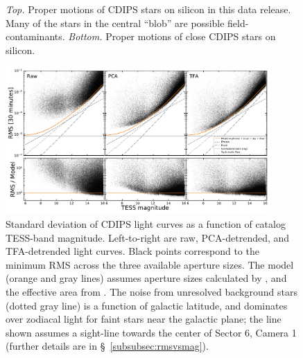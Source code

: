 \documentclass[12pt,twocolumn,tighten,trackchanges]{aastex62}
\begin{document}
\begin{figure}[!t]
	\vspace{-0.9cm}
	\vspace{-0.9cm}
	\caption{
		{\it Top.} Proper motions of CDIPS stars on silicon in this
		data release.  Many of the stars in the central ``blob'' are possible
		field-contaminants.
		{\it Bottom.} Proper motions of close CDIPS stars
		on silicon.
	}
	\label{fig:propermotions}
\end{figure}

\begin{figure}[!t]
	\begin{center}
		\leavevmode
		\includegraphics[width=0.9\textwidth]{IRM-PCA-TFA_rms_vs_mag.pdf}
	\end{center}
	\vspace{-0.7cm}
	\caption{
    Standard deviation of CDIPS light curves as a function of catalog
    TESS-band magnitude.  Left-to-right are raw, PCA-detrended, and
    TFA-detrended light curves. Black points correspond to the minimum
    RMS across the three available aperture sizes.  The model (orange
    and gray lines) assumes aperture sizes calculated by
    \citet{Sullivan_et_al_2015}, and the effective area from
    \citet{vanderspek_2018}.  The noise from unresolved background
    stars (dotted gray line) is a function of galactic latitude, and
    dominates over zodiacal light for faint stars near the galactic
    plane; the line shown assumes a sight-line towards the center of
    Sector 6, Camera 1 (further details are in
    \S~\ref{subsubsec:rmsvsmag}).
		\label{fig:rms_vs_mag}
	}
\end{figure}
\end{document}
